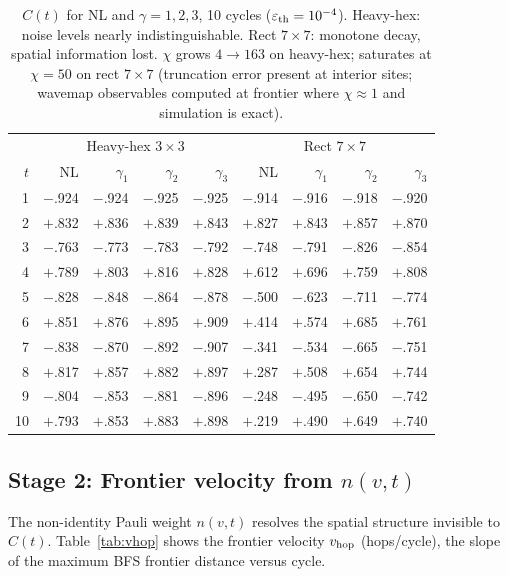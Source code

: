 \documentclass[letterpaper]{article}
\begin{document}
\begin{table}[t]
\centering
\setlength{\tabcolsep}{3pt}
\small
\begin{tabular}{r|rrrr|rrrr}
\toprule
 & \multicolumn{4}{c|}{Heavy-hex $3\times3$} & \multicolumn{4}{c}{Rect $7\times7$} \\
$t$ & NL & $\gamma_1$ & $\gamma_2$ & $\gamma_3$ & NL & $\gamma_1$ & $\gamma_2$ & $\gamma_3$ \\
\midrule
 1 & $-$.924 & $-$.924 & $-$.925 & $-$.925 & $-$.914 & $-$.916 & $-$.918 & $-$.920 \\
 2 & $+$.832 & $+$.836 & $+$.839 & $+$.843 & $+$.827 & $+$.843 & $+$.857 & $+$.870 \\
 3 & $-$.763 & $-$.773 & $-$.783 & $-$.792 & $-$.748 & $-$.791 & $-$.826 & $-$.854 \\
 4 & $+$.789 & $+$.803 & $+$.816 & $+$.828 & $+$.612 & $+$.696 & $+$.759 & $+$.808 \\
 5 & $-$.828 & $-$.848 & $-$.864 & $-$.878 & $-$.500 & $-$.623 & $-$.711 & $-$.774 \\
 6 & $+$.851 & $+$.876 & $+$.895 & $+$.909 & $+$.414 & $+$.574 & $+$.685 & $+$.761 \\
 7 & $-$.838 & $-$.870 & $-$.892 & $-$.907 & $-$.341 & $-$.534 & $-$.665 & $-$.751 \\
 8 & $+$.817 & $+$.857 & $+$.882 & $+$.897 & $+$.287 & $+$.508 & $+$.654 & $+$.744 \\
 9 & $-$.804 & $-$.853 & $-$.881 & $-$.896 & $-$.248 & $-$.495 & $-$.650 & $-$.742 \\
10 & $+$.793 & $+$.853 & $+$.883 & $+$.898 & $+$.219 & $+$.490 & $+$.649 & $+$.740 \\
\bottomrule
\end{tabular}
\caption{$C(t)$ for NL and $\gamma=1,2,3$, 10 cycles ($\varepsilon_{\rm th}=10^{-4}$).
Heavy-hex: noise levels nearly indistinguishable.
Rect $7\times7$: monotone decay, spatial information lost.
$\chi$ grows $4\to163$ on heavy-hex; saturates at $\chi=50$ on rect $7\times7$
(truncation error present at interior sites; wavemap observables computed at
frontier where $\chi\approx1$ and simulation is exact).}
\label{tab:ct}
\end{table}

\subsection{Stage 2: Frontier velocity from $n(v,t)$}

The non-identity Pauli weight $n(v,t)$ resolves the spatial structure
invisible to $C(t)$.
Table~\ref{tab:vhop} shows the frontier velocity $v_{\rm hop}$
(hops/cycle), the slope of the maximum BFS frontier distance versus cycle.
\end{document}

